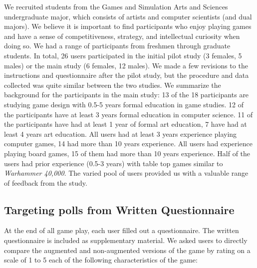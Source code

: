 \documentclass[review]{vgtc}                 %
\begin{document}
We recruited students from the Games and Simulation Arts and Sciences
undergraduate major, which consists of artists and computer scientists
(and dual majors).
%
We believe it is important to find participants who enjoy playing
games and have a sense of competitiveness, strategy, and intellectual
curiosity when doing so.
%
We had a range of participants from freshmen through graduate
students.  In total, 26 users participated in the initial pilot study
(3 females, 5 males) or the main study (6 females, 12 males).  We made
a few revisions to the instructions and questionnaire after the pilot
study, but the procedure and data collected was quite similar between
the two studies.  We summarize the background for the participants in
the main study: 13 of the 18 participants are studying game design
with 0.5-5 years formal education in game studies.  12 of the
participants have at least 3 years formal education in computer
science.  11 of the participants have had at least 1 year of formal
art education, 7 have had at least 4 years art education.  All users
had at least 3 years experience playing computer games, 14 had more
than 10 years experience.  All users had experience playing board
games, 15 of them had more than 10 years experience.  Half of the
users had prior experience (0.5-3 years) with table top games similar
to {\em Warhammer 40,000}.  The varied pool of users provided us
with a valuable range of feedback from the study. 

\subsection{Targeting polls from Written Questionnaire}


At the end of all game play, each user filled out a questionnaire.
The written questionnaire is included as supplementary material.  We
asked users to directly compare the augmented and non-augmented
versions of the game by rating on a scale of 1 to 5 each of the
following characteristics of the game:\vspace{-0.1in}
\end{document}
